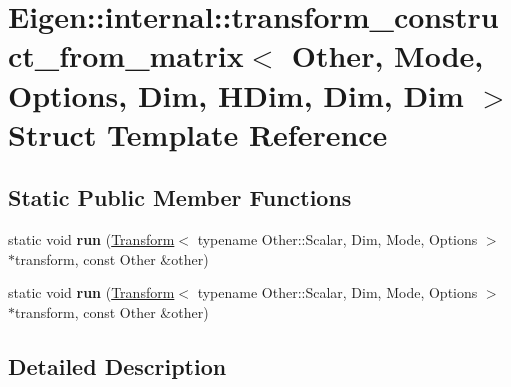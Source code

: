 \hypertarget{struct_eigen_1_1internal_1_1transform__construct__from__matrix_3_01_other_00_01_mode_00_01_optio6dcff4dd79db682c85f7e1f5d15fb563}{}\section{Eigen\+:\+:internal\+:\+:transform\+\_\+construct\+\_\+from\+\_\+matrix$<$ Other, Mode, Options, Dim, H\+Dim, Dim, Dim $>$ Struct Template Reference}
\label{struct_eigen_1_1internal_1_1transform__construct__from__matrix_3_01_other_00_01_mode_00_01_optio6dcff4dd79db682c85f7e1f5d15fb563}
\subsection*{Static Public Member Functions}
\begin{DoxyCompactItemize}
\item 
\mbox{\label{struct_eigen_1_1internal_1_1transform__construct__from__matrix_3_01_other_00_01_mode_00_01_optio6dcff4dd79db682c85f7e1f5d15fb563_af4c45b77c8995f01a933d753f7a5c3b1}} 
static void {\bfseries run} (\hyperlink{group___geometry___module_class_eigen_1_1_transform}{Transform}$<$ typename Other\+::\+Scalar, Dim, Mode, Options $>$ $\ast$transform, const Other \&other)
\item 
\mbox{\label{struct_eigen_1_1internal_1_1transform__construct__from__matrix_3_01_other_00_01_mode_00_01_optio6dcff4dd79db682c85f7e1f5d15fb563_af4c45b77c8995f01a933d753f7a5c3b1}} 
static void {\bfseries run} (\hyperlink{group___geometry___module_class_eigen_1_1_transform}{Transform}$<$ typename Other\+::\+Scalar, Dim, Mode, Options $>$ $\ast$transform, const Other \&other)
\end{DoxyCompactItemize}


\subsection{Detailed Description}
